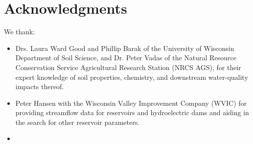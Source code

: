 \section{Acknowledgments}
We thank:
\begin{itemize}
	\item Drs. Laura Ward Good and Phillip Barak of the University of Wisconsin Department of Soil Science, and Dr. Peter Vadas of the Natural Resource Conservation Service Agricultural Research Station (NRCS AGS), for their expert knowledge of soil properties, chemistry, and downstream water-quality impacts thereof.
	\item Peter Hansen with the Wisconsin Valley Improvement Company (WVIC) for providing streamflow data for reservoirs and hydroelectric dams and aiding in the search for other reservoir parameters.
	\item 
\end{itemize}
\pagebreak